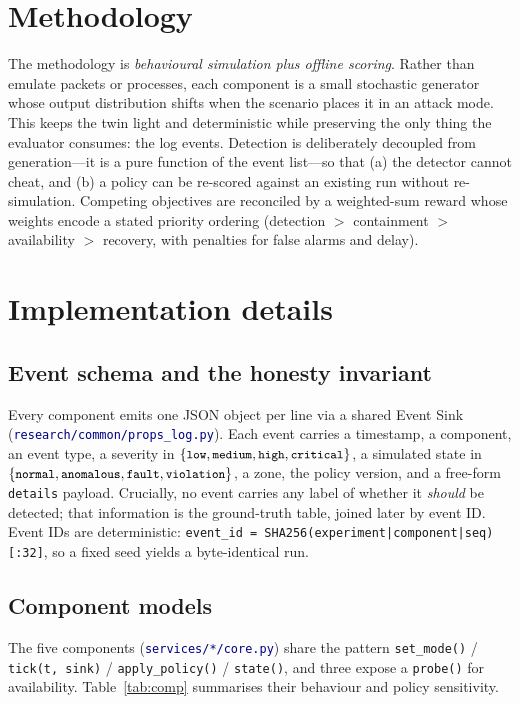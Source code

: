 \documentclass[11pt]{article}
\newcommand{\code}[1]{\texttt{\small #1}}
\newcommand{\file}[1]{\textcolor{navy}{\texttt{\small #1}}}
\begin{document}
\section{Methodology}
The methodology is \emph{behavioural simulation plus offline scoring}. Rather than
emulate packets or processes, each component is a small stochastic generator whose
output distribution shifts when the scenario places it in an attack mode. This
keeps the twin light and deterministic while preserving the only thing the
evaluator consumes: the log events. Detection is deliberately decoupled from
generation---it is a pure function of the event list---so that (a) the detector
cannot cheat, and (b) a policy can be re-scored against an existing run without
re-simulation. Competing objectives are reconciled by a weighted-sum reward whose
weights encode a stated priority ordering (detection $>$ containment $>$
availability $>$ recovery, with penalties for false alarms and delay).

\section{Implementation details}
\label{sec:impl}

\subsection{Event schema and the honesty invariant}
Every component emits one JSON object per line via a shared Event Sink
(\file{research/common/props\_log.py}). Each event carries a timestamp, a
component, an event type, a severity in
$\{\code{low},\code{medium},\code{high},\code{critical}\}$, a simulated state in
$\{\code{normal},\code{anomalous},\code{fault},\code{violation}\}$, a zone, the
policy version, and a free-form \code{details} payload. Crucially, no event
carries any label of whether it \emph{should} be detected; that information is the
ground-truth table, joined later by event ID. Event IDs are deterministic:
\code{event\_id = SHA256(experiment|component|seq)[:32]}, so a fixed seed yields a
byte-identical run.

\subsection{Component models}
The five components (\file{services/*/core.py}) share the pattern
\code{set\_mode()} / \code{tick(t, sink)} / \code{apply\_policy()} /
\code{state()}, and three expose a \code{probe()} for availability.
Table~\ref{tab:comp} summarises their behaviour and policy sensitivity.
\end{document}
